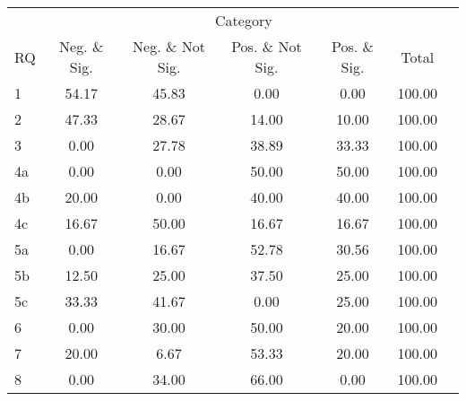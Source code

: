 \begin{tabular}{lcccccc}
\hline
\hline
 & \multicolumn{5}{c}{Category} \\
RQ&Neg. \& Sig.&Neg. \& Not Sig.&Pos. \& Not Sig.&Pos. \& Sig.&Total \\
%
\hline
1&54.17&45.83&0.00&0.00&100.00 \\
2&47.33&28.67&14.00&10.00&100.00 \\
3&0.00&27.78&38.89&33.33&100.00 \\
4a&0.00&0.00&50.00&50.00&100.00 \\
4b&20.00&0.00&40.00&40.00&100.00 \\
4c&16.67&50.00&16.67&16.67&100.00 \\
5a&0.00&16.67&52.78&30.56&100.00 \\
5b&12.50&25.00&37.50&25.00&100.00 \\
5c&33.33&41.67&0.00&25.00&100.00 \\
6&0.00&30.00&50.00&20.00&100.00 \\
7&20.00&6.67&53.33&20.00&100.00 \\
8&0.00&34.00&66.00&0.00&100.00 \\
\hline
\hline
\end{tabular}
